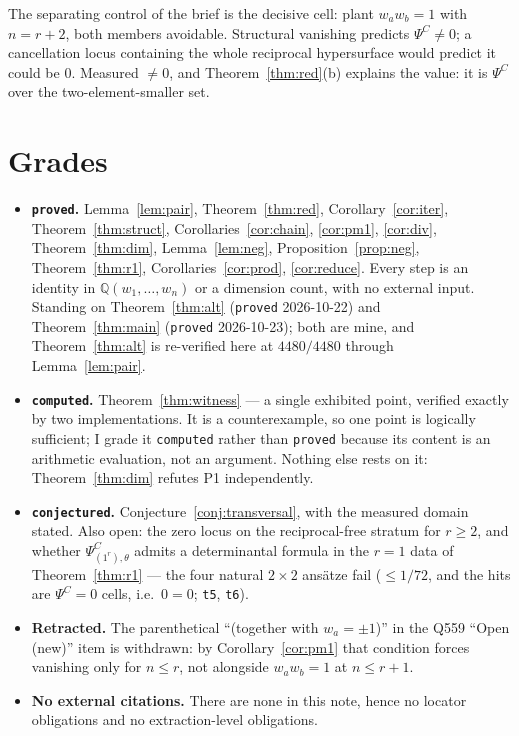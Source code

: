 \documentclass[11pt]{article}
\theoremstyle{definition}
\theoremstyle{remark}
\newcommand{\PsiC}{\Psi^{C}}
\newcommand{\QQ}{\mathbb{Q}}
\begin{document}
The separating control of the brief is the decisive cell: plant $w_aw_b=1$ with
$n=r+2$, both members avoidable. Structural vanishing predicts $\PsiC\ne0$; a
cancellation locus containing the whole reciprocal hypersurface would predict it
could be $0$. Measured $\ne0$, and Theorem~\ref{thm:red}(b) explains the value:
it is $\PsiC$ over the two-element-smaller set.

\section{Grades}

\begin{itemize}
\item \textbf{\texttt{proved}.} Lemma~\ref{lem:pair}, Theorem~\ref{thm:red},
  Corollary~\ref{cor:iter}, Theorem~\ref{thm:struct},
  Corollaries~\ref{cor:chain}, \ref{cor:pm1}, \ref{cor:div},
  Theorem~\ref{thm:dim}, Lemma~\ref{lem:neg}, Proposition~\ref{prop:neg},
  Theorem~\ref{thm:r1}, Corollaries~\ref{cor:prod}, \ref{cor:reduce}.
  Every step is an identity in $\QQ(w_1,\dots,w_n)$ or a dimension count, with no
  external input. Standing on Theorem~\ref{thm:alt} (\texttt{proved} 2026-10-22)
  and Theorem~\ref{thm:main} (\texttt{proved} 2026-10-23); both are mine, and
  Theorem~\ref{thm:alt} is re-verified here at $4480/4480$ through
  Lemma~\ref{lem:pair}.
\item \textbf{\texttt{computed}.} Theorem~\ref{thm:witness} --- a single exhibited
  point, verified exactly by two implementations. It is a counterexample, so one
  point is logically sufficient; I grade it \texttt{computed} rather than
  \texttt{proved} because its content is an arithmetic evaluation, not an
  argument. Nothing else rests on it: Theorem~\ref{thm:dim} refutes P1
  independently.
\item \textbf{\texttt{conjectured}.} Conjecture~\ref{conj:transversal}, with the
  measured domain stated. Also open: the zero locus on the reciprocal-free
  stratum for $r\ge2$, and whether $\PsiC_{(1^r),\theta}$ admits a determinantal
  formula in the $r=1$ data of Theorem~\ref{thm:r1} --- the four natural $2\times2$
  ansätze fail ($\le1/72$, and the hits are $\PsiC=0$ cells, i.e.\ $0=0$;
  \texttt{t5}, \texttt{t6}).
\item \textbf{Retracted.} The parenthetical ``(together with $w_a=\pm1$)'' in the
  Q559 ``Open (new)'' item is withdrawn: by Corollary~\ref{cor:pm1} that condition
  forces vanishing only for $n\le r$, not alongside $w_aw_b=1$ at $n\le r+1$.
\item \textbf{No external citations.} There are none in this note, hence no
  locator obligations and no extraction-level obligations.
\end{itemize}
\end{document}
